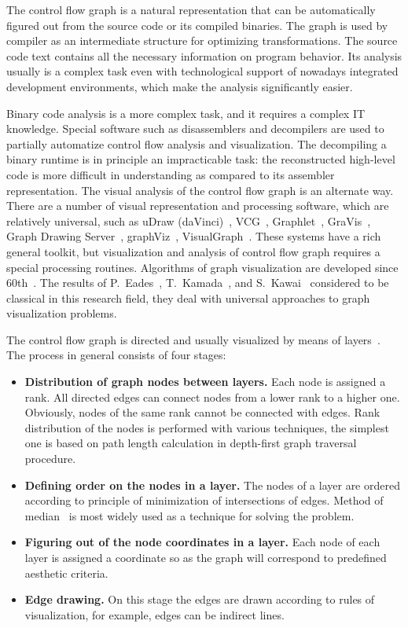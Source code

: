 \documentclass[conference]{IEEEtran}
\begin{document}
The control flow graph is a natural representation that can be automatically figured out from the source code or its compiled binaries.  The graph is used by compiler as an intermediate structure for optimizing transformations.  The source code text contains all the necessary information on program behavior.  Its analysis usually is a complex task even with technological support of nowadays integrated development environments, which make the analysis significantly easier.

Binary code analysis is a more complex task, and it requires a complex IT knowledge.  Special software such as disassemblers and decompilers are used to partially automatize control flow analysis and visualization.  The decompiling a binary runtime is in principle an impracticable task: the reconstructed high-level code is more difficult in understanding as compared to its assembler representation.  The visual analysis of the control flow graph is an alternate way.  There are a number of visual representation and processing software, which are relatively universal, such as uDraw (daVinci)~\cite{10}, VCG~\cite{14}, Graphlet~\cite{12}, GraVis~\cite{13}, Graph Drawing Server~\cite{9}, graphViz~\cite{11}, VisualGraph~\cite{15}.  These systems have a rich general toolkit, but visualization and analysis of control flow graph requires a special processing routines. Algorithms of graph visualization are developed since 60th~\cite{7}.  The results of P.~Eades~\cite{5}, T.~Kamada~\cite{q1}, and S.~Kawai~\cite{6} considered to be classical in this research field, they deal with universal approaches to graph visualization problems.

The control flow graph is directed and usually visualized by means of layers~\cite{4}.  The process in general consists of four stages:
\begin{itemize}
\item \textbf{Distribution of graph nodes between layers.} Each node is assigned a rank.  All directed edges can connect nodes from a lower rank to a higher one.  Obviously, nodes of the same rank cannot be connected with edges.  Rank distribution of the nodes is performed with various techniques, the simplest one is based on path length calculation in depth-first graph traversal procedure.
\item \textbf{Defining order on the nodes in a layer.} The nodes of a layer are ordered according to principle of minimization of intersections of edges.  Method of median~\cite{8} is most widely used as a technique for solving the problem.
\item \textbf{Figuring out of the node coordinates in a layer.} Each node of each layer is assigned a coordinate so as the graph will correspond to predefined aesthetic criteria.
\item \textbf{Edge drawing.} On this stage the edges are drawn according to rules of visualization, for example, edges can be indirect lines.
\end{itemize}
\end{document}
